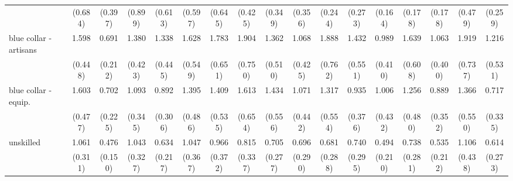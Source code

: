 {\begin{tabular}{l*{16}{c}}
                    &     (0.684)         &     (0.397)         &     (0.899)         &     (0.613)         &     (0.597)         &     (0.645)         &     (0.425)         &     (0.349)         &     (0.356)         &     (0.244)         &     (0.273)         &     (0.164)         &     (0.178)         &     (0.178)         &     (0.479)         &     (0.259)         \\
[1em]
blue collar - artisans&       1.598         &       0.691         &       1.380         &       1.338         &       1.628         &       1.783         &       1.904         &       1.362         &       1.068         &       1.888         &       1.432         &       0.989         &       1.639         &       1.063         &       1.919         &       1.216         \\
                    &     (0.448)         &     (0.212)         &     (0.423)         &     (0.445)         &     (0.549)         &     (0.651)         &     (0.750)         &     (0.510)         &     (0.425)         &     (0.762)         &     (0.551)         &     (0.410)         &     (0.608)         &     (0.400)         &     (0.737)         &     (0.531)         \\
[1em]
blue collar - equip.&       1.603         &       0.702         &       1.093         &       0.892         &       1.395         &       1.409         &       1.613         &       1.434         &       1.071         &       1.317         &       0.935         &       1.006         &       1.256         &       0.889         &       1.366         &       0.717         \\
                    &     (0.477)         &     (0.225)         &     (0.345)         &     (0.306)         &     (0.486)         &     (0.535)         &     (0.654)         &     (0.556)         &     (0.442)         &     (0.554)         &     (0.376)         &     (0.432)         &     (0.480)         &     (0.352)         &     (0.550)         &     (0.335)         \\
[1em]
unskilled           &       1.061         &       0.476\sym{*}  &       1.043         &       0.634         &       1.047         &       0.966         &       0.815         &       0.705         &       0.696         &       0.681         &       0.740         &       0.494         &       0.738         &       0.535         &       1.106         &       0.614         \\
                    &     (0.311)         &     (0.150)         &     (0.327)         &     (0.217)         &     (0.367)         &     (0.372)         &     (0.337)         &     (0.277)         &     (0.290)         &     (0.288)         &     (0.295)         &     (0.210)         &     (0.281)         &     (0.212)         &     (0.438)         &     (0.273)         \\

\end{tabular}}
